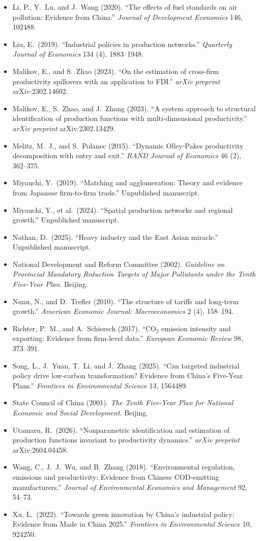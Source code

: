 \documentclass[11pt,a4paper]{article}
\begin{document}
\begin{itemize}
\item Li, P., Y.\ Lu, and J.\ Wang (2020). ``The effects of fuel standards on air pollution: Evidence from China.'' \textit{Journal of Development Economics} 146, 102488.\item Liu, E.\ (2019). ``Industrial policies in production networks.'' \textit{Quarterly Journal of Economics} 134 (4), 1883--1948.
\item Malikov, E., and S.\ Zhao (2023). ``On the estimation of cross-firm productivity spillovers with an application to FDI.'' \textit{arXiv preprint} arXiv:2302.14602.
\item Malikov, E., S.\ Zhao, and J.\ Zhang (2023). ``A system approach to structural identification of production functions with multi-dimensional productivity.'' \textit{arXiv preprint} arXiv:2302.13429.\item Melitz, M.\ J., and S.\ Polanec (2015). ``Dynamic Olley-Pakes productivity decomposition with entry and exit.'' \textit{RAND Journal of Economics} 46 (2), 362--375.\item Miyauchi, Y.\ (2019). ``Matching and agglomeration: Theory and evidence from Japanese firm-to-firm trade.'' Unpublished manuscript.
\item Miyauchi, Y., et al.\ (2024). ``Spatial production networks and regional growth.'' Unpublished manuscript.
\item Nathan, D.\ (2025). ``Heavy industry and the East Asian miracle.'' Unpublished manuscript.
\item National Development and Reform Committee (2002). \textit{Guideline on Provincial Mandatory Reduction Targets of Major Pollutants under the Tenth Five-Year Plan}. Beijing.
\item Nunn, N., and D.\ Trefler (2010). ``The structure of tariffs and long-term growth.'' \textit{American Economic Journal: Macroeconomics} 2 (4), 158--194.
\item Richter, P.\ M., and A.\ Schiersch (2017). ``CO$_2$ emission intensity and exporting: Evidence from firm-level data.'' \textit{European Economic Review} 98, 373--391.
\item Song, L., J.\ Yuan, T.\ Li, and J.\ Zhang (2025). ``Can targeted industrial policy drive low-carbon transformation? Evidence from China's Five-Year Plans.'' \textit{Frontiers in Environmental Science} 13, 1564489.
\item State Council of China (2001). \textit{The Tenth Five-Year Plan for National Economic and Social Development}. Beijing.
\item Utamaru, R.\ (2026). ``Nonparametric identification and estimation of production functions invariant to productivity dynamics.'' \textit{arXiv preprint} arXiv:2604.04458.\item Wang, C., J.\ J.\ Wu, and B.\ Zhang (2018). ``Environmental regulation, emissions and productivity: Evidence from Chinese COD-emitting manufacturers.'' \textit{Journal of Environmental Economics and Management} 92, 54--73.
\item Xu, L.\ (2022). ``Towards green innovation by China's industrial policy: Evidence from Made in China 2025.'' \textit{Frontiers in Environmental Science} 10, 924250.\end{itemize}
\end{document}
